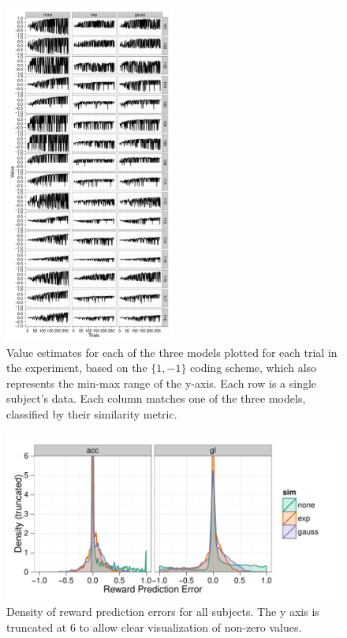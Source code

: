 \begin{figure}[tp]
    \includegraphics[width=0.5\textwidth]{f_value_gl}
    \centering
    \caption{Value estimates for each of the three models plotted for each trial in the experiment, based on the $\{1,-1\}$ coding scheme, which also represents the min-max range of the y-axis.   Each row is a single subject's data.  Each column matches one of the three models, classified by their similarity metric.}
    \label{fig:valuegl}
\end{figure}
\begin{figure}[tp]
    \includegraphics{f_density_rpe}
    \centering
    \caption{Density of reward prediction errors for all subjects.  The y axis is truncated at 6 to allow clear visualization of non-zero values.}
    \label{fig:denrpe}
\end{figure}

